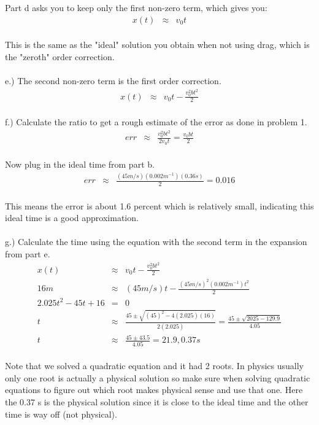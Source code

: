\documentclass[11pt]{amsart}
\begin{document}
Part d asks you to keep only the first non-zero term, which gives you: \\ 
\begin{eqnarray*} 
x(t) &\approx& v_{0}t 
\end{eqnarray*} \\
This is the same as the "ideal" solution you obtain when not using drag, which is the "zeroth" order correction. \\ \\
e.) The second non-zero term is the first order correction. \\ 
\begin{eqnarray*}
x(t) &\approx& v_{0}t -\frac{v_{0}^{2}bt^{2}}{2} 
\end{eqnarray*}  \\
f.) Calculate the ratio to get a rough estimate of the error as done in problem 1. \\ 
\begin{eqnarray*}
err &\approx& \frac{v_{0}^{2}bt^{2}}{2v_{0}t} = \frac{v_{0}bt}{2} 
\end{eqnarray*} \\
Now plug in the ideal time from part b. \\ 
\begin{eqnarray*}
err &\approx& \frac{(45m/s)(0.002m^{-1})(0.36s)}{2} = 0.016 
\end{eqnarray*} \\
This means the error is about 1.6 percent which is relatively small, indicating this ideal time is a good approximation. \\ \\
g.) Calculate the time using the equation with the second term in the expansion from part e. \\ 
\begin{eqnarray*}
x(t) &\approx&  v_{0}t -\frac{v_{0}^{2}bt^{2}}{2} \\
16m &\approx& (45m/s)t - \frac{(45m/s)^{2}(0.002m^{-1})t^{2}}{2} \\
2.025t^{2} - 45t +16 &=& 0 \\
t &\approx& \frac{45±\sqrt{(45)^{2}-4(2.025)(16)}}{2(2.025)} = \frac{45±\sqrt{2025-129.9}}{4.05} \\
t&\approx& \frac{45±43.5}{4.05} = 21.9, 0.37 s 
\end{eqnarray*} \\
Note that we solved a quadratic equation and it had 2 roots. In physics usually only one root is actually a physical solution so make sure when solving quadratic equations to figure out which root makes physical sense and use that one. Here the 0.37 s is the physical solution since it is close to the ideal time and the other time is way off (not physical). \\ 
\end{document}
